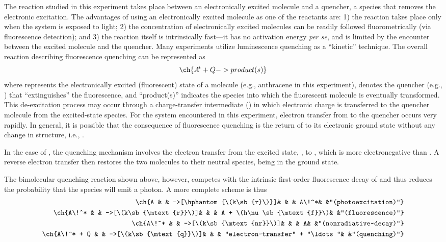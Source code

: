 The reaction studied in this experiment takes place between an electronically excited molecule and a quencher, a species that removes the electronic excitation. 
The advantages of using an electronically excited molecule as one of the reactants are: 
1) the reaction takes place only when the system is exposed to light; 
2) the concentration of electronically excited molecules can be readily followed fluorometrically (via fluorescence detection); and 
3) the reaction itself is intrinsically fast---it has no activation energy \emph{per se}, and is limited by the encounter between the excited molecule and the quencher. 
Many experiments utilize luminescence quenching as a ``kinetic'' technique. 
The overall reaction describing fluorescence quenching can be represented as
\[
	\ch{A\!^* + Q -> product(s)}
\]
where  represents the electronically excited (fluorescent) state of a molecule (e.g., anthracene in this experiment),  denotes the quencher (e.g., ) that ``extinguishes'' the  fluorescence, and ``product(s)'' indicates the species into which the fluorescent molecule is eventually transformed. 
This de-excitation process may occur through a charge-transfer intermediate () in which electronic charge is transferred to the quencher molecule from the excited-state species.
For the system encountered in this experiment, electron transfer from  to the quencher occurs very rapidly. 
In general, it is possible that the consequence of fluorescence quenching is the return of  to its electronic ground state without any change in structure, i.e., .

In the case of , the quenching mechanism involves the electron transfer from the excited state, , to , which is more electronegative than . 
A reverse electron transfer then restores the two molecules to their neutral species,  being in the ground state. 

The bimolecular quenching reaction shown above, however, competes with the intrinsic first-order fluorescence decay of  and thus reduces the probability that the  species will emit a photon. A more complete scheme is thus
\begin{align*}
	\ch{A 			&	&	->[\hphantom{\(k\sb{r}\)}]&	&	&	A\!^*&														&"(photoexcitation)"} \\
	\ch{A\!^* 		&	&	->[\(k\sb{\mtext{r}}\)]&	&	&						A + \(h\nu\sb{\mtext{f}}\)&							&"(fluorescence)"} \\
	\ch{A\!^* 		&	&	->[\(k\sb{\mtext{nr}}\)]&	&	&						A&															&"(nonradiative~decay)"} \\
	\ch{A\!^* + Q	&	&	->[\(k\sb{\mtext{q}}\)]&	&	&						"electron~transfer" + "\ldots"&	&"(quenching)"}
\end{align*}

